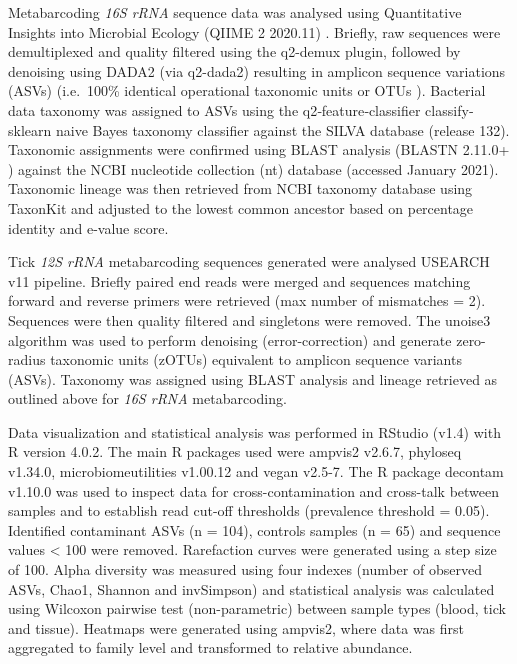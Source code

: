 \documentclass[a4paper, nobind]{templates/ociamthesis}
\begin{document}
Metabarcoding \emph{16S rRNA} sequence data was analysed using Quantitative Insights into Microbial Ecology (QIIME 2 2020.11) \autocite{bolyenReproducibleInteractiveScalable2019}. Briefly, raw sequences were demultiplexed and quality filtered using the q2-demux plugin, followed by denoising using DADA2 (via q2-dada2) \autocite{callahanDADA2HighresolutionSample2016} resulting in amplicon sequence variations (ASVs) (i.e.~100\% identical operational taxonomic units or OTUs \autocite{callahanExactSequenceVariants2017}).
Bacterial data taxonomy was assigned to ASVs using the q2‐feature‐classifier \autocite{bokulichOptimizingTaxonomicClassification2018} classify‐sklearn naive Bayes taxonomy classifier against the SILVA database \autocite{quastSILVARibosomalRNA2013} (release 132).
Taxonomic assignments were confirmed using BLAST analysis (BLASTN 2.11.0+ \autocite{zhangGreedyAlgorithmAligning2000,morgulisDatabaseIndexingProduction2008}) against the NCBI nucleotide collection (nt) database (accessed January 2021).
Taxonomic lineage was then retrieved from NCBI taxonomy database using TaxonKit \autocite{weissHostReproductiveCycle2021} and adjusted to the lowest common ancestor based on percentage identity and e-value score.

Tick \emph{12S rRNA} metabarcoding sequences generated were analysed USEARCH v11 \autocite{edgarSearchClusteringOrders2010} pipeline.
Briefly paired end reads were merged and sequences matching forward and reverse primers were retrieved (max number of mismatches = 2).
Sequences were then quality filtered and singletons were removed.
The unoise3 \autocite{edgarUNOISE2ImprovedErrorcorrection2016} algorithm was used to perform denoising (error-correction) and generate zero-radius taxonomic units (zOTUs) equivalent to amplicon sequence variants (ASVs).
Taxonomy was assigned using BLAST analysis and lineage retrieved as outlined above for \emph{16S rRNA} metabarcoding.

Data visualization and statistical analysis was performed in RStudio (v1.4) with R version 4.0.2. The main R packages used were ampvis2 v2.6.7, phyloseq v1.34.0, microbiomeutilities v1.00.12 and vegan v2.5-7. The R package decontam v1.10.0 \autocite{davisSimpleStatisticalIdentification2018} was used to inspect data for cross-contamination and cross-talk between samples and to establish read cut-off thresholds (prevalence threshold = 0.05). Identified contaminant ASVs (n = 104), controls samples (n = 65) and sequence values \textless{} 100 were removed. Rarefaction curves were generated using a step size of 100. Alpha diversity was measured using four indexes (number of observed ASVs, Chao1, Shannon and invSimpson) and statistical analysis was calculated using Wilcoxon pairwise test (non-parametric) between sample types (blood, tick and tissue). Heatmaps were generated using ampvis2, where data was first aggregated to family level and transformed to relative abundance.
\end{document}

